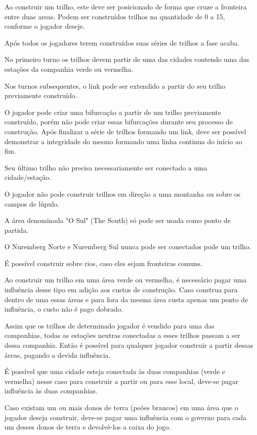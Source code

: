 \documentclass[11pt]{article}
\begin{document}
Ao construir um trilho, este deve ser posicionado de forma que cruze a fronteira entre duas areas. Podem ser construídos trilhos na quantidade de 0 a 15, conforme o jogador deseje.

Após todos os jogadores terem construídos suas séries de trilhos a fase acaba.

No primeiro turno os trilhos devem partir de uma das cidades contendo uma das estações da companhia verde ou vermelha.

Nos turnos subsequentes, o link pode ser extendido a partir do seu trilho previamente construído.

O jogador pode criar uma bifurcação a partir de um trilho previamente construído, porém não pode criar essas bifurcações durante seu processo de construção. Após finalizar a série de trilhos
formando um link, deve ser possível demonstrar a integridade do mesmo formando uma linha continua do início ao fim.

Seu último trilho não precisa necessariamente ser conectado a uma cidade/estação.

O jogador não pode construir trilhos em direção a uma montanha ou sobre os campos de lúpulo.

A área denominada "O Sul" (The South) só pode ser usada como ponto de partida.

O Nuremberg Norte e Nuremberg Sul nunca pode ser conectados pode um trilho.

É possível construir sobre rios, caso eles sejam fronteiras comuns.

Ao construir um trilho em uma área verde ou vermelha, é necessário pagar uma influência desse tipo em adição aos custos de construção. Caso construa para dentro de uma essas áreas e para fora da mesma área
custa apenas um ponto de influência, o custo não é pago dobrado.

Assim que os trilhos de determinado jogador é vendido para uma das companhias, todas as estações neutras conectadas a esses trilhos passam a ser dessa companhia. Então é possível para qualquer jogador
construir a partir dessas áreas, pagando a devida influência.

É possível que uma cidade esteja conectada às duas companhias (verde e vermelha) nesse caso para construir a partir ou para esse local, deve-se pagar influência às duas companhias.

Caso existam um ou mais donos de terra (peões brancos) em uma área que o jogador deseja construir, deve-se pagar uma influência com o governo para cada um desses donos de terra e devolvê-los a caixa
do jogo.
\end{document}
